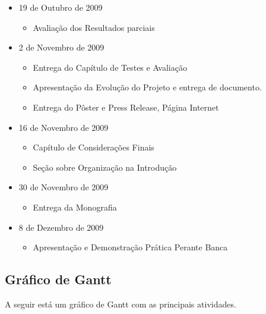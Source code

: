 \documentclass[]{article}
\begin{document}
\begin{itemize}
  \item 19 de Outubro de 2009
  \begin{itemize}
    \item Avaliação dos Resultados parciais
  \end{itemize}
  
  \item 2 de Novembro de 2009
  \begin{itemize}
    \item Entrega do Capítulo de Testes e Avaliação
    \item Apresentação da Evolução do Projeto e entrega de documento.
    \item Entrega do Pôster e Press Release, Página Internet
  \end{itemize}
  
  \item 16 de Novembro de 2009
  \begin{itemize}
    \item Capítulo de Considerações Finais
    \item Seção sobre Organização na Introdução
  \end{itemize}
  
  \item 30 de Novembro de 2009
  \begin{itemize}
    \item Entrega da Monografia
  \end{itemize}
  
  \item 8 de Dezembro de 2009
  \begin{itemize}
    \item Apresentação e Demonstração Prática Perante Banca
  \end{itemize}
\end{itemize}

\subsection{Gráfico de Gantt}

A seguir está um gráfico de Gantt com as principais atividades.
\end{document}
